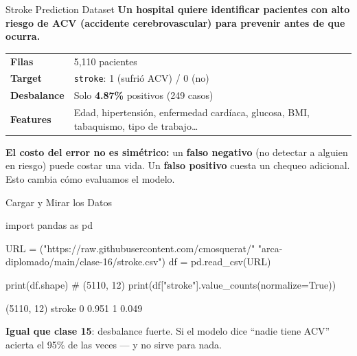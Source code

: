 \documentclass[aspectratio=169, 11pt]{beamer}
\begin{document}
\begin{frame}{Stroke Prediction Dataset}
  \vspace{-4pt}
  {\footnotesize\color{arcaDark}\bfseries
    Un hospital quiere identificar pacientes con \textbf{alto riesgo
    de ACV} (accidente cerebrovascular) para prevenir antes de que ocurra.}

  \vspace{6pt}
  {\scriptsize
  \begin{tabular}{@{}ll@{}}
    \toprule
    \textbf{Filas} & 5{,}110 pacientes \\
    \textbf{Target} & \texttt{stroke}: 1 (sufrió ACV) / 0 (no) \\
    \textbf{Desbalance} & Solo \textbf{4.87\%} positivos (249 casos) \\
    \textbf{Features} & Edad, hipertensión, enfermedad cardíaca, glucosa,
      BMI, tabaquismo, tipo de trabajo\ldots \\
    \bottomrule
  \end{tabular}
  }

  \vspace{8pt}
  \begin{tcolorbox}[colback=arcaRed!8, colframe=arcaRed, boxrule=0.5pt, arc=2pt,
    left=6pt, right=6pt, top=4pt, bottom=4pt]
    {\footnotesize\color{arcaDark}
    \faExclamationTriangle\hspace{4pt}\textbf{El costo del error no es simétrico:}
    un \textbf{falso negativo} (no detectar a alguien en riesgo) puede costar
    una vida. Un \textbf{falso positivo} cuesta un chequeo adicional.
    Esto cambia cómo evaluamos el modelo.}
  \end{tcolorbox}
\end{frame}

\begin{frame}[fragile,shrink=25]{Cargar y Mirar los Datos}
  \vspace{-6pt}
  \begin{pyblock}
import pandas as pd

URL = ("https://raw.githubusercontent.com/cmosquerat/"
       "arca-diplomado/main/clase-16/stroke.csv")
df = pd.read_csv(URL)

print(df.shape)        # (5110, 12)
print(df["stroke"].value_counts(normalize=True))
  \end{pyblock}

  \vspace{4pt}
  \begin{outputblock}
(5110, 12)
stroke
0    0.951
1    0.049
  \end{outputblock}

  \vspace{4pt}
  {\scriptsize\color{textMuted}
    \faLightbulb\hspace{4pt} \textbf{Igual que clase 15}: desbalance fuerte.
    Si el modelo dice ``nadie tiene ACV'' acierta el 95\% de las veces
    --- y no sirve para nada.}
\end{frame}
\end{document}
